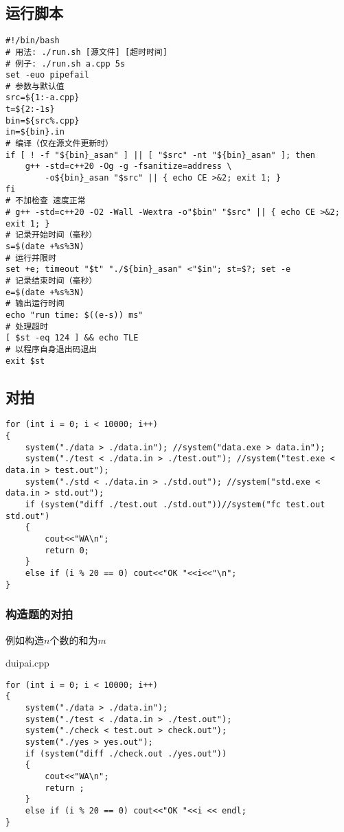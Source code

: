 \documentclass[a4paper,fontset=none]{ctexart}
\begin{document}
\subsection{运行脚本}
\begin{verbatim}
#!/bin/bash
# 用法: ./run.sh [源文件] [超时时间]
# 例子: ./run.sh a.cpp 5s
set -euo pipefail
# 参数与默认值
src=${1:-a.cpp}
t=${2:-1s}
bin=${src%.cpp}
in=${bin}.in
# 编译（仅在源文件更新时）
if [ ! -f "${bin}_asan" ] || [ "$src" -nt "${bin}_asan" ]; then
    g++ -std=c++20 -Og -g -fsanitize=address \
        -o${bin}_asan "$src" || { echo CE >&2; exit 1; }
fi
# 不加检查 速度正常
# g++ -std=c++20 -O2 -Wall -Wextra -o"$bin" "$src" || { echo CE >&2; exit 1; }
# 记录开始时间（毫秒）
s=$(date +%s%3N)
# 运行并限时
set +e; timeout "$t" "./${bin}_asan" <"$in"; st=$?; set -e
# 记录结束时间（毫秒）
e=$(date +%s%3N)
# 输出运行时间
echo "run time: $((e-s)) ms"
# 处理超时
[ $st -eq 124 ] && echo TLE
# 以程序自身退出码退出
exit $st
\end{verbatim}
\subsection{对拍}

\begin{verbatim}
for (int i = 0; i < 10000; i++)
{
    system("./data > ./data.in"); //system("data.exe > data.in");
    system("./test < ./data.in > ./test.out"); //system("test.exe < data.in > test.out");
    system("./std < ./data.in > ./std.out"); //system("std.exe < data.in > std.out");
    if (system("diff ./test.out ./std.out"))//system("fc test.out std.out")
    {
        cout<<"WA\n";
        return 0;
    }
    else if (i % 20 == 0) cout<<"OK "<<i<<"\n";
}
\end{verbatim}
\subsubsection{构造题的对拍}

例如构造$n$个数的和为$m$

duipai.cpp
\begin{verbatim}
for (int i = 0; i < 10000; i++)
{
    system("./data > ./data.in");
    system("./test < ./data.in > ./test.out");
    system("./check < test.out > check.out");
    system("./yes > yes.out");
    if (system("diff ./check.out ./yes.out"))
    {
        cout<<"WA\n";
        return ;
    }
    else if (i % 20 == 0) cout<<"OK "<<i << endl;
}
\end{verbatim}
\end{document}
